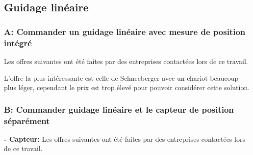 \subsection{Guidage linéaire}
\subsubsection{A: Commander un guidage linéaire avec mesure de position intégré}
Les offres suivantes ont été faites par des entreprises contactées lors de ce travail.

\begin{table}[H]
    \centering
    \caption{Offres pour le guidage linéaire avec mesure de position}
    \label{tab:OffreGuidPos}
\end{table}

L'offre la plus intéressante est celle de Schneeberger avec un chariot beaucoup plus léger, cependant le prix est trop élevé pour pouvoir considérer cette solution.

\subsubsection{B: Commander guidage linéaire et le capteur de position séparément}
\textbf{ - Capteur:}
\newline
Les offres suivantes ont été faites par des entreprises contactées lors de ce travail.

\begin{table}[H]
    \centering
    \caption{Offres pour le capteur pour la mesure de position}
    \label{tab:OffrePos}
\end{table}

